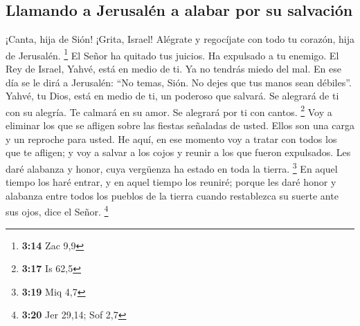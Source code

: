 \hypertarget{llamando-a-jerusaluxe9n-a-alabar-por-su-salvaciuxf3n}{%
\subsection{Llamando a Jerusalén a alabar por su
salvación}\label{llamando-a-jerusaluxe9n-a-alabar-por-su-salvaciuxf3n}}

 ¡Canta, hija de Sión! ¡Grita, Israel! Alégrate y
regocíjate con todo tu corazón, hija de Jerusalén. \footnote{\textbf{3:14}
  Zac 9,9}  El Señor ha quitado tus juicios. Ha expulsado
a tu enemigo. El Rey de Israel, Yahvé, está en medio de ti. Ya no
tendrás miedo del mal.  En ese día se le dirá a
Jerusalén: ``No temas, Sión. No dejes que tus manos sean débiles''.
 Yahvé, tu Dios, está en medio de ti, un poderoso que
salvará. Se alegrará de ti con su alegría. Te calmará en su amor. Se
alegrará por ti con cantos. \footnote{\textbf{3:17} Is 62,5}
 Voy a eliminar los que se afligen sobre las fiestas
señaladas de usted. Ellos son una carga y un reproche para usted.
 He aquí, en ese momento voy a tratar con todos los que
te afligen; y voy a salvar a los cojos y reunir a los que fueron
expulsados. Les daré alabanza y honor, cuya vergüenza ha estado en toda
la tierra. \footnote{\textbf{3:19} Miq 4,7}  En aquel
tiempo los haré entrar, y en aquel tiempo los reuniré; porque les daré
honor y alabanza entre todos los pueblos de la tierra cuando restablezca
su suerte ante sus ojos, dice el Señor. \footnote{\textbf{3:20} Jer
  29,14; Sof 2,7}
